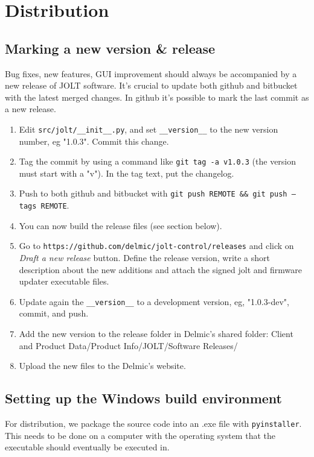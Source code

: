 \documentclass[]{article}
\begin{document}
\section{Distribution}

\subsection{Marking a new version \& release}

Bug fixes, new features, GUI improvement should always be accompanied by a new release of JOLT software. It's crucial to update both github and bitbucket with the latest merged changes.
In github it's possible to mark the last commit as a new release.
\begin{enumerate}
    \item Edit \texttt{src/jolt/\_\_init\_\_.py}, and set \texttt{\_\_version\_\_} to the new version number, eg "1.0.3".
    Commit this change.
    \item Tag the commit by using a command like \texttt{git tag -a v1.0.3} (the version must start with a "v").
    In the tag text, put the changelog.
    \item Push to both github and bitbucket with \texttt{git push REMOTE \&\& git push --tags REMOTE}.
    \item You can now build the release files (see section below).
    \item Go to \texttt{https://github.com/delmic/jolt-control/releases} and click on \emph{Draft a new release} button.
    Define the release version, write a short description about the new additions and attach the signed jolt and firmware updater executable files.
    \item Update again the \texttt{\_\_version\_\_} to a development version, eg, "1.0.3-dev", commit, and push.
    \item Add the new version to the release folder in Delmic's shared folder: Client and Product Data/Product Info/JOLT/Software Releases/
    \item Upload the new files to the Delmic's website.
\end{enumerate}


\subsection{Setting up the Windows build environment}
For distribution, we package the source code into an .exe file with \texttt{pyinstaller}.
This needs to be done on a computer with the operating system that the executable should eventually be executed in.
\end{document}
